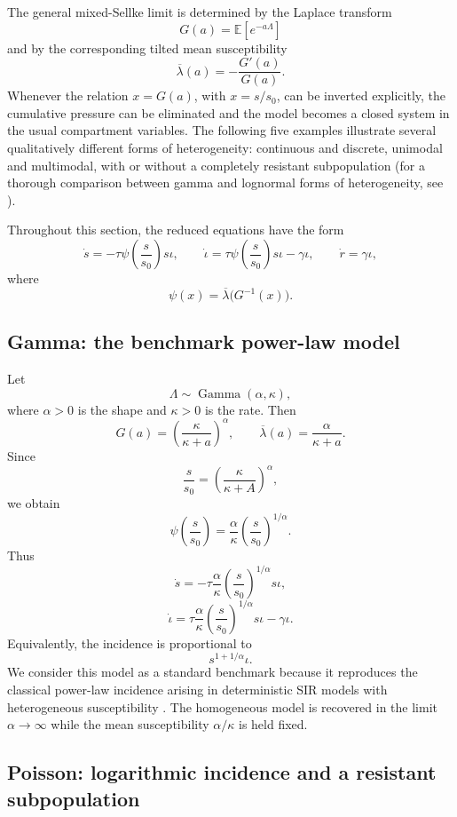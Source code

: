 \documentclass[pdflatex,sn-mathphys-ay]{sn-jnl}
\theoremstyle{thmstyleone}
\theoremstyle{thmstyletwo}
\theoremstyle{thmstylethree}
\newcommand{\E}{\mathbb{E}}
\begin{document}
The general mixed-Sellke limit is determined by the Laplace transform
\[
G(a)=\E[e^{-a\Lambda}]
\]
and by the corresponding tilted mean susceptibility
\[
\overline{\lambda}(a)=-\frac{G'(a)}{G(a)}.
\]
Whenever the relation \(x=G(a)\), with \(x=s/s_0\), can be inverted explicitly,
the cumulative pressure can be eliminated and the model becomes a closed system
in the usual compartment variables.  The following five examples illustrate
several qualitatively different forms of heterogeneity: continuous and
discrete, unimodal and multimodal, with or without a completely resistant
subpopulation (for a thorough comparison between gamma and lognormal forms of heterogeneity, see \cite{mohammed2026exploration}).

Throughout this section, the reduced equations have the form
\[
\dot s=-\tau\psi\!\left(\frac{s}{s_0}\right)s\iota,
\qquad
\dot\iota=\tau\psi\!\left(\frac{s}{s_0}\right)s\iota-\gamma\iota,
\qquad
\dot r=\gamma\iota,
\]
where
\[
\psi(x)=\overline{\lambda}\bigl(G^{-1}(x)\bigr).
\]

\subsection{Gamma: the benchmark power-law model}

Let
\[
\Lambda\sim\operatorname{Gamma}(\alpha,\kappa),
\]
where \(\alpha>0\) is the shape and \(\kappa>0\) is the rate.  Then
\[
G(a)=\left(\frac{\kappa}{\kappa+a}\right)^\alpha,
\qquad
\overline{\lambda}(a)=\frac{\alpha}{\kappa+a}.
\]
Since
\[
\frac{s}{s_0}=\left(\frac{\kappa}{\kappa+A}\right)^\alpha,
\]
we obtain
\[
\psi\!\left(\frac{s}{s_0}\right)
=\frac{\alpha}{\kappa}
\left(\frac{s}{s_0}\right)^{1/\alpha}.
\]
Thus
\[
\dot s
=-\tau\frac{\alpha}{\kappa}
\left(\frac{s}{s_0}\right)^{1/\alpha}s\iota,
\]
\[
\dot\iota
=\tau\frac{\alpha}{\kappa}
\left(\frac{s}{s_0}\right)^{1/\alpha}s\iota
-\gamma\iota.
\]
Equivalently, the incidence is proportional to
\[
s^{1+1/\alpha}\iota.
\]
We consider this model as a standard benchmark because it reproduces the classical
power-law incidence arising in deterministic SIR models with heterogeneous
susceptibility \citep{Novozhilov2008,GomesEtAl2022}. The homogeneous model is
recovered in the limit \(\alpha \to \infty\) while the mean susceptibility
\(\alpha/\kappa\) is held fixed.

\subsection{Poisson: logarithmic incidence and a resistant subpopulation}
\end{document}

